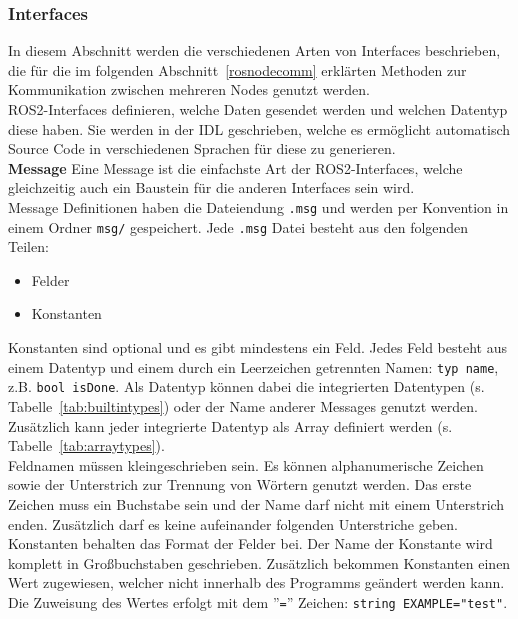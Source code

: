 \subsubsection{Interfaces}
In diesem Abschnitt werden die verschiedenen Arten von Interfaces beschrieben, die für die im folgenden Abschnitt~\ref{rosnodecomm} erklärten Methoden zur Kommunikation zwischen mehreren Nodes genutzt werden.\\
\ac{ROS2}-Interfaces definieren, welche Daten gesendet werden und welchen Datentyp diese haben.
Sie werden in der \ac{IDL} geschrieben, welche es ermöglicht automatisch Source Code in verschiedenen Sprachen für diese zu generieren.\\

\textbf{Message} Eine Message ist die einfachste Art der \ac{ROS2}-Interfaces, welche gleichzeitig auch ein Baustein für die anderen Interfaces sein wird.\\
Message Definitionen haben die Dateiendung \verb|.msg| und werden per Konvention in einem Ordner \verb|msg/| gespeichert.
Jede \verb|.msg| Datei besteht aus den folgenden Teilen:
\begin{itemize}
\item Felder
\item Konstanten
\end{itemize}
Konstanten sind optional und es gibt mindestens ein Feld.
Jedes Feld besteht aus einem Datentyp und einem durch ein Leerzeichen getrennten Namen: \verb|typ name|, z.B. \verb|bool isDone|.
Als Datentyp können dabei die integrierten Datentypen (s. Tabelle~\ref{tab:builtintypes}) oder der Name anderer Messages genutzt werden.
Zusätzlich kann jeder integrierte Datentyp als Array definiert werden (s. Tabelle~\ref{tab:arraytypes}).\\
Feldnamen müssen kleingeschrieben sein.
Es können alphanumerische Zeichen sowie der Unterstrich zur Trennung von Wörtern genutzt werden.
Das erste Zeichen muss ein Buchstabe sein und der Name darf nicht mit einem Unterstrich enden.
Zusätzlich darf es keine aufeinander folgenden Unterstriche geben.\\
Konstanten behalten das Format der Felder bei.
Der Name der Konstante wird komplett in Großbuchstaben geschrieben.
Zusätzlich bekommen Konstanten einen Wert zugewiesen, welcher nicht innerhalb des Programms geändert werden kann.
Die Zuweisung des Wertes erfolgt mit dem ''\verb|=|'' Zeichen: \verb|string EXAMPLE="test"|.
